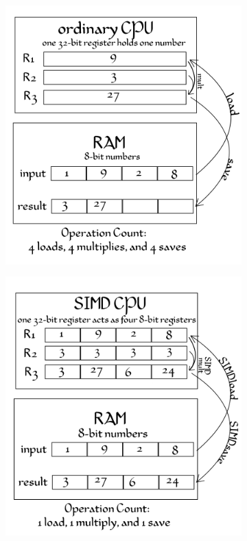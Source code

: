 \begin{figure}\label{f:simd}
	\begin{center}
		\begin{subfigure}[b]{0.48\textwidth}
			\includegraphics[width=1.0\textwidth]{graphics/gi/path-16-1}		\end{subfigure}
		\begin{subfigure}[b]{0.48\textwidth}
			\includegraphics[width=1.0\textwidth]{graphics/gi/path-16-2}

\end{subfigure}
\end{center}
\end{figure}
